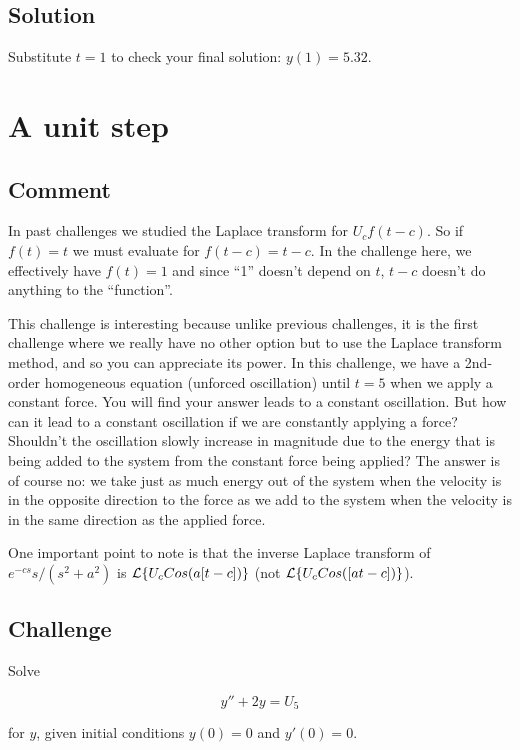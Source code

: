 \subsection*{Solution}
Substitute $t=1$ to check your final solution: $y(1)=5.32$.




\newpage
\section{A unit step}

\subsection*{Comment}
In past challenges we studied the Laplace transform for $U_c f(t-c)$. So if $f(t)=t$ we must evaluate for $f(t-c)=t-c$. In the challenge here, we effectively have $f(t)=1$ and since ``1'' doesn't depend on $t$, $t-c$ doesn't do anything to the ``function''.

This challenge is interesting because unlike previous challenges, it is the first challenge where we really have no other option but to use the Laplace transform method, and so you can appreciate its power. In this challenge, we have a 2nd-order homogeneous equation (unforced oscillation) until $t=5$ when we apply a constant force. You will find your answer leads to a constant oscillation. But how can it lead to a constant oscillation if we are constantly applying a force? Shouldn't the oscillation slowly increase in magnitude due to the energy that is being added to the system from the constant force being applied? The answer is of course no: we take just as much energy out of the system when the velocity is in the opposite direction to the force as we add to the system when the velocity is in the same direction as the applied force.

One important point to note is that the inverse Laplace transform of $e^{-cs} s/(s^2+a^2)$ is $\mathcal{L}\{U_c Cos(a[t-c])\}$ (not $\mathcal{L}\{U_c Cos([at-c])\}$).

\subsection*{Challenge}
Solve

\begin{equation}
    y''+2y=U_5
\end{equation}

for $y$, given initial conditions $y(0)=0$ and $y'(0)=0$. 

